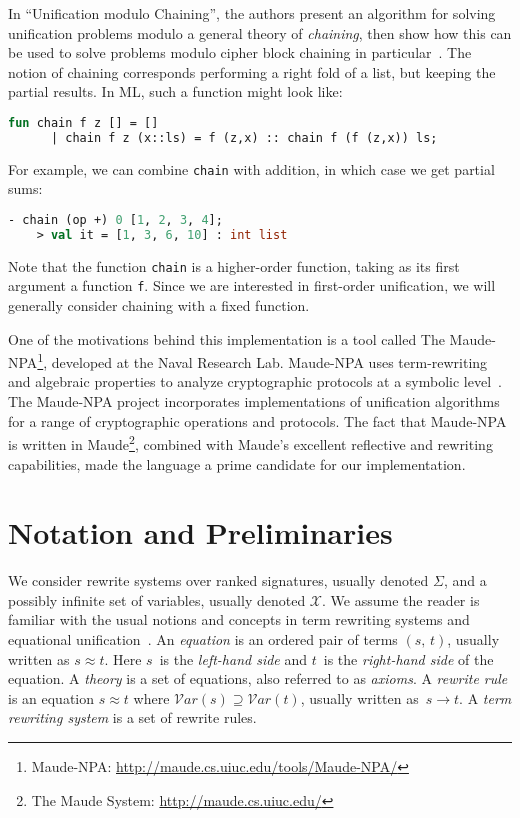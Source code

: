 \documentclass[11pt]{article}
\newcommand{\X}{\mathcal{X}}
\newcommand{\Var}{\mathcal{V}\!ar}
\begin{document}
In ``Unification modulo Chaining'', the authors present an algorithm for
solving unification problems modulo a general theory of \emph{chaining}, then
show how this can be used to solve problems modulo cipher block chaining in
particular~\cite{anantharaman2012unification}. The notion of chaining
corresponds performing a right fold of a list, but keeping the partial results.
In ML, such a function might look like:
\begin{lstlisting}[language=ML, style=smalllisting]
    fun chain f z [] = []
      | chain f z (x::ls) = f (z,x) :: chain f (f (z,x)) ls;
\end{lstlisting}
For example, we can combine \lstinline|chain| with addition, in which case we
get partial sums:
\begin{lstlisting}[language=ML, style=smalllisting]
    - chain (op +) 0 [1, 2, 3, 4];
    > val it = [1, 3, 6, 10] : int list
\end{lstlisting}
Note that the function \lstinline|chain| is a higher-order function, taking as
its first argument a function \lstinline|f|. Since we are interested in
first-order unification, we will generally consider chaining with a fixed
function.

One of the motivations behind this implementation is a tool called The
Maude-NPA\footnote{Maude-NPA: \url{http://maude.cs.uiuc.edu/tools/Maude-NPA/}},
developed at the Naval Research Lab. Maude-NPA uses term-rewriting and
algebraic properties to analyze cryptographic protocols at a symbolic
level~\cite{escobar2009maude}.  The Maude-NPA project incorporates
implementations of unification algorithms for a range of cryptographic
operations and protocols. The fact that Maude-NPA is written in
Maude\footnote{The Maude System: \url{http://maude.cs.uiuc.edu/}}, combined
with Maude's excellent reflective and rewriting capabilities, made the language
a prime candidate for our implementation.

\section{Notation and Preliminaries}\label{section:notation}

We consider rewrite systems over ranked signatures, usually denoted $\Sigma$,
and a possibly infinite set of variables, usually denoted $\X$. We assume the
reader is familiar with the usual notions and concepts in term rewriting
systems and equational unification~\cite{Term, BaaderSnyd-01}. An
\emph{equation} is an ordered pair of terms $(s, \, t)$, usually written as $s
\approx t$. Here $s$~is the \emph{le\vspace{-0.2pt}ft-hand side} and $t$~is the
\emph{right-hand side} of the equation. A \emph{theory} is a set of equations,
also referred to as \emph{axioms}. A \emph{rewrite rule} is an equation $s
\approx t$ where $\Var(s) \supseteq \Var(t)$, usually written as~$s \to t$. A
\emph{term rewriting system} is a set of rewrite rules.
\end{document}
